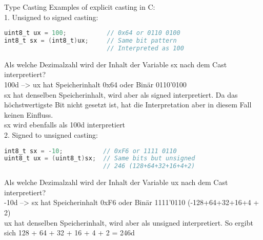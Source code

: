 \begin{example2}{Type Casting}
Examples of explicit casting in C:
\vspace{1mm}\\
1. Unsigned to signed casting:
\begin{lstlisting}[language=C, style=basesmol]
uint8_t ux = 100;           // 0x64 or 0110 0100
int8_t sx = (int8_t)ux;     // Same bit pattern
                            // Interpreted as 100
\end{lstlisting}

Als welche Dezimalzahl wird der Inhalt der Variable sx nach dem Cast interpretiert?
\vspace{1mm}\\
100d --> ux hat Speicherinhalt 0x64 oder Binär 0110'0100
\vspace{1mm}\\
sx hat denselben Speicherinhalt, wird aber als signed
interpretiert. Da das höchstwertigste Bit nicht gesetzt ist, hat die
Interpretation aber in diesem Fall keinen Einfluss.
\vspace{1mm}\\
sx wird ebenfalls als 100d interpretiert
\vspace{2mm}\\
2. Signed to unsigned casting:
\begin{lstlisting}[language=C, style=basesmol]
int8_t sx = -10;           // 0xF6 or 1111 0110
uint8_t ux = (uint8_t)sx;  // Same bits but unsigned
                           // 246 (128+64+32+16+4+2)
\end{lstlisting}

Als welche Dezimalzahl wird der Inhalt der Variable ux nach dem Cast interpretiert?
\vspace{1mm}\\
-10d --> sx hat Speicherinhalt 0xF6 oder Binär 1111'0110
(-128+64+32+16+4 + 2)
\vspace{1mm}\\
ux hat denselben Speicherinhalt, wird aber als unsigned
interpretiert. So ergibt sich 128 + 64 + 32 + 16 + 4 + 2 = 246d
\end{example2}







